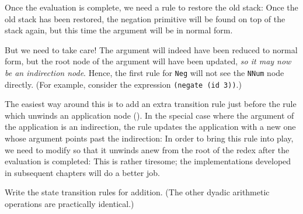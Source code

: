 Once the evaluation is complete, we need a rule to restore the old
stack:
\label{rule:num-return}
Once the old stack has been restored, the negation primitive
will be found on top of the stack again, but this time the argument
will be in normal form.

But we need to take care!  The argument will indeed have been
reduced to normal form, but the root node of the argument will
have been updated, {\em so it may now
be an indirection node}.
Hence, the first rule for \mbox{\tt Neg} will not see the \mbox{\tt NNum} node directly.
(For example, consider the expression \mbox{\tt (negate\ (id\ 3))}.)

The easiest way around this is to add an extra transition rule
just before the rule which unwinds an application node ().
In the special case where the argument of the application is
an indirection,
the rule updates the application with a new one whose argument points past
the indirection:
\label{rule:unwind-indarg}
In order to
bring this rule into play, we need to modify 
so that it unwinds anew from the root of the redex after the evaluation is
completed:
\label{rule:negate-eval1}
This is rather tiresome; the implementations developed in
subsequent chapters will do a better job.

\begin{exercise}
Write the state transition rules for addition.
(The other dyadic arithmetic operations are practically identical.)
\end{exercise}

